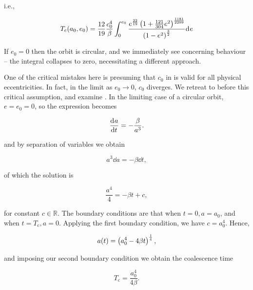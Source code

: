 i.e.,

\begin{tcolorbox}[enhanced,title={The coalescence time of inspiralling compact objects}]
    \begin{equation}
        T_\text{c}(a_0, e_0) = \frac{12}{19}\frac{c_0^4}{\beta}\int_0^{e_0} \frac{e^\frac{22}{19}\pqty{1+\frac{121}{304}e^2}^\frac{1181}{2299}}{\pqty{1-e^2}^\frac32}\dd{e}
        \label{eq:coalescence_time_formal}
    \end{equation}
\end{tcolorbox}

If $e_0=0$ then the orbit is circular, and we immediately see concerning behaviour -- the integral collapses to zero, necessitating a different approach.

One of the critical mistakes here is presuming that $c_0$ in  is valid for all physical eccentricities. In fact, in the limit as $e_0 \to 0$, $c_0$ diverges. We retreat to before this critical assumption, and examine . In the limiting case of a circular orbit, $e=e_0=0$, so the expression becomes

\begin{equation}
    \dv{a}{t} = -\frac{\beta}{a^3}.
\end{equation}

and by separation of variables we obtain

\begin{equation}
    a^3 \dd{a} = -\beta\dd{t},
\end{equation}

of which the solution is

\begin{equation}
    \frac{a^4}{4} = -\beta t + c,
\end{equation}

for constant $c\in\mathbb{R}$. The boundary conditions are that when $t=0, a=a_0$, and when $t=T_\text{c}, a=0$. Applying the first boundary condition, we have $c=a_0^4$. Hence,

\begin{equation}
    a(t) = \left(a_0^4-4\beta t\right)^\frac14 ,
\end{equation}

and imposing our second boundary condition we obtain the coalescence time

\begin{equation}
    T_\text{c} = \frac{a_0^4}{4\beta}.
\end{equation}

